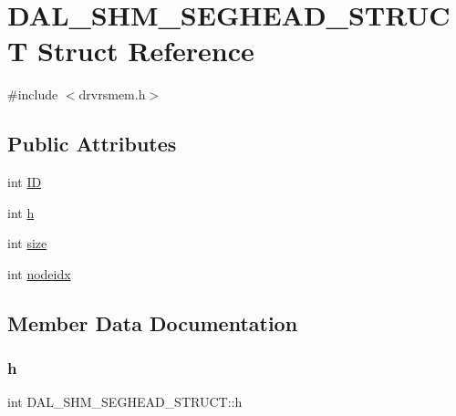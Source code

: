 \hypertarget{struct_d_a_l___s_h_m___s_e_g_h_e_a_d___s_t_r_u_c_t}{}\section{D\+A\+L\+\_\+\+S\+H\+M\+\_\+\+S\+E\+G\+H\+E\+A\+D\+\_\+\+S\+T\+R\+U\+CT Struct Reference}
\label{struct_d_a_l___s_h_m___s_e_g_h_e_a_d___s_t_r_u_c_t}


{\ttfamily \#include $<$drvrsmem.\+h$>$}

\subsection*{Public Attributes}
\begin{DoxyCompactItemize}
\item 
int \hyperlink{struct_d_a_l___s_h_m___s_e_g_h_e_a_d___s_t_r_u_c_t_ae33dedada8d4eceeeb1a4a1b36855b2d}{ID}
\item 
int \hyperlink{struct_d_a_l___s_h_m___s_e_g_h_e_a_d___s_t_r_u_c_t_ab20308ac35ff56d81c74b2edcfa29c80}{h}
\item 
int \hyperlink{struct_d_a_l___s_h_m___s_e_g_h_e_a_d___s_t_r_u_c_t_aedd426298ff66445326f09e3eae5087d}{size}
\item 
int \hyperlink{struct_d_a_l___s_h_m___s_e_g_h_e_a_d___s_t_r_u_c_t_a07f8531ec3ce7ae39b4db53b3a8af4bf}{nodeidx}
\end{DoxyCompactItemize}


\subsection{Member Data Documentation}
\mbox{\label{struct_d_a_l___s_h_m___s_e_g_h_e_a_d___s_t_r_u_c_t_ab20308ac35ff56d81c74b2edcfa29c80}} 
\subsubsection{\texorpdfstring{h}{h}}
{\footnotesize\ttfamily int D\+A\+L\+\_\+\+S\+H\+M\+\_\+\+S\+E\+G\+H\+E\+A\+D\+\_\+\+S\+T\+R\+U\+C\+T\+::h}

